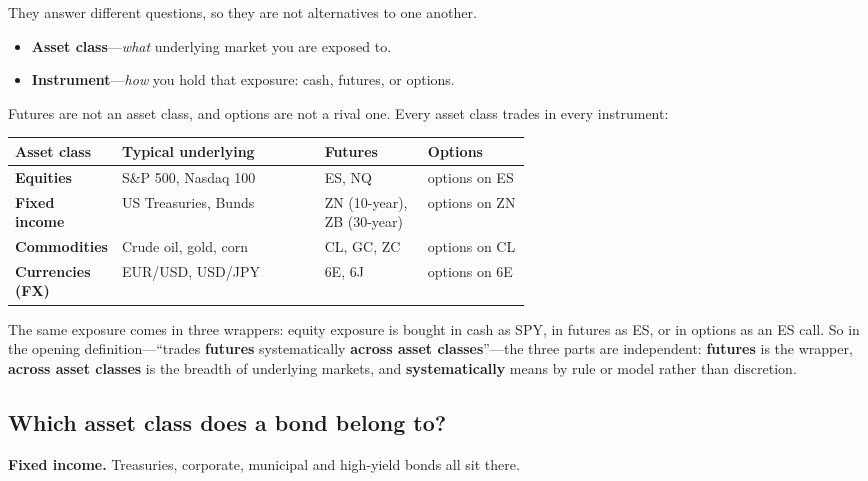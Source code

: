 They answer different questions, so they are not alternatives to one another.

\begin{itemize}
  \item \textbf{Asset class}---\emph{what} underlying market you are exposed to.
  \item \textbf{Instrument}---\emph{how} you hold that exposure: cash, futures, or options.
\end{itemize}

Futures are not an asset class, and options are not a rival one. Every asset class trades in every
instrument:

\begin{tabularx}{\linewidth}{|>{\raggedright\arraybackslash}p{0.20\linewidth}|X|>{\raggedright\arraybackslash}p{0.20\linewidth}|>{\raggedright\arraybackslash}p{0.20\linewidth}|}
\hline
\textbf{Asset class} & \textbf{Typical underlying} & \textbf{Futures} & \textbf{Options} \\ \hline
\textbf{Equities}     & S\&P 500, Nasdaq 100      & ES, NQ                       & options on ES \\ \hline
\textbf{Fixed income} & US Treasuries, Bunds      & ZN (10-year), ZB (30-year)   & options on ZN \\ \hline
\textbf{Commodities}  & Crude oil, gold, corn     & CL, GC, ZC                   & options on CL \\ \hline
\textbf{Currencies (FX)} & EUR/USD, USD/JPY          & 6E, 6J                       & options on 6E \\ \hline
\end{tabularx}

The same exposure comes in three wrappers: equity exposure is bought in cash as SPY, in futures as
ES, or in options as an ES call. So in the opening definition---``trades \textbf{futures}
systematically \textbf{across asset classes}''---the three parts are independent:
\textbf{futures} is the wrapper, \textbf{across asset classes} is the breadth of underlying markets,
and \textbf{systematically} means by rule or model rather than discretion.

\subsection*{Which asset class does a bond belong to?}

\textbf{Fixed income.} Treasuries, corporate, municipal and high-yield bonds all sit there.

